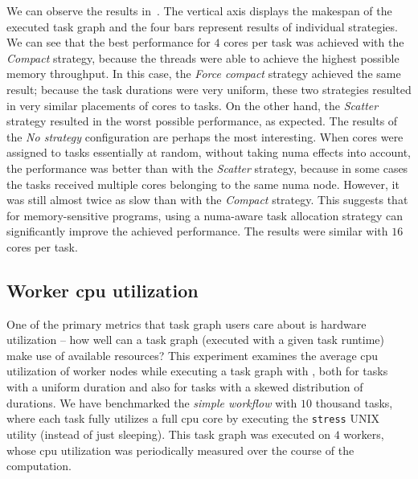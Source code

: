 We can observe the results in~. The vertical axis displays the makespan of
the executed task graph and the four bars represent results of individual strategies. We can
see that the best performance for $4$ cores per task was achieved with the
\emph{Compact} strategy, because the threads were able to achieve the highest possible
memory throughput. In this case, the \emph{Force compact} strategy achieved the same result;
because the task durations were very uniform, these two strategies resulted in very similar
placements of cores to tasks. On the other hand, the \emph{Scatter} strategy resulted in
the worst possible performance, as expected. The results of the \emph{No strategy} configuration
are perhaps the most interesting. When cores were assigned to tasks essentially at random,
without taking \gls{numa} effects into account, the performance was
better than with the \emph{Scatter} strategy, because in some cases the tasks received multiple
cores belonging to the same \gls{numa} node. However, it was still almost twice as slow than
with the \emph{Compact} strategy. This suggests that for memory-sensitive programs, using a
\gls{numa}-aware task allocation strategy can significantly improve the achieved
performance. The results were similar with $16$ cores per task.


\subsection{Worker \acrshort{cpu} utilization}
\label{sec:hq-cpu-utilization}
One of the primary metrics that task graph users care about is hardware utilization -- how well can
a task graph (executed with a given task runtime) make use of available resources? This experiment
examines the average \gls{cpu} utilization of worker nodes while executing a task
graph with \hyperqueue{}, both for tasks with a uniform duration and also for tasks with
a skewed distribution of durations. We have benchmarked the \emph{simple workflow} with
$10$ thousand tasks, where each task fully utilizes a full
\gls{cpu} core by executing the \texttt{stress} UNIX utility (instead of just
sleeping). This task graph was executed on $4$ workers, whose
\gls{cpu} utilization was periodically measured over the course of the computation.

